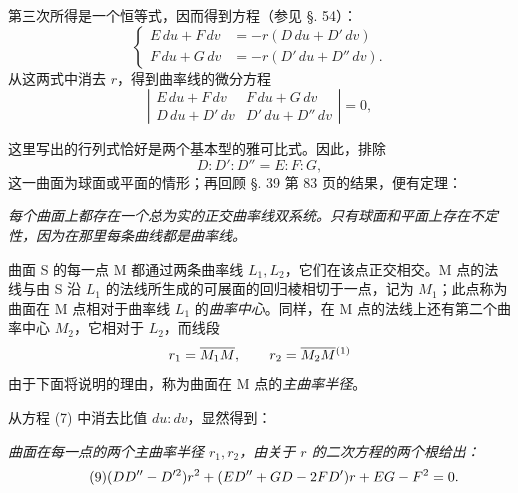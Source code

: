 第三次所得是一个恒等式，因而得到方程（参见 \S. 54）：
\begin{equation}\tag{7}
\left\{
\begin{aligned}
 E\,du+F\,dv&=-r(D\,du+D'\,dv)\\
 F\,du+G\,dv&=-r(D'\,du+D''\,dv).
\end{aligned}
\right.
\end{equation}
从这两式中消去 \(r\)，得到曲率线的微分方程
\begin{equation}\tag{8}
\left|
\begin{matrix}
 E\,du+F\,dv & F\,du+G\,dv\\
 D\,du+D'\,dv & D'\,du+D''\,dv
\end{matrix}
\right|=0,
\end{equation}

这里写出的行列式恰好是两个基本型的雅可比式。因此，排除
\[
 D:D':D''=E:F:G,
\]
这一曲面为球面或平面的情形；再回顾 \S. 39 第 83 页的结果，便有定理：

\emph{每个曲面上都存在一个总为实的正交曲率线双系统。只有球面和平面上存在不定性，因为在那里每条曲线都是曲率线。}

曲面 S 的每一点 M 都通过两条曲率线 \(L_1,L_2\)，它们在该点正交相交。M 点的法线与由 S 沿 \(L_1\) 的法线所生成的可展面的回归棱相切于一点，记为 \(M_1\)；此点称为曲面在 M 点相对于曲率线 \(L_1\) 的\emph{曲率中心}。同样，在 M 点的法线上还有第二个曲率中心 \(M_2\)，它相对于 \(L_2\)，而线段
\[
 r_1=\overline{M_1M},\qquad r_2=\overline{M_2M}\srcfnmark{1}
\]
由于下面将说明的理由，称为曲面在 M 点的\emph{主曲率半径}。

从方程 (7) 中消去比值 \(du:dv\)，显然得到：

\emph{曲面在每一点的两个主曲率半径 \(r_1,r_2\)，由关于 \(r\) 的二次方程的两个根给出：}
\begin{equation}\tag{9}
 (DD''-D'^2)r^2+(ED''+GD-2FD')r+EG-F^2=0.
\end{equation}

